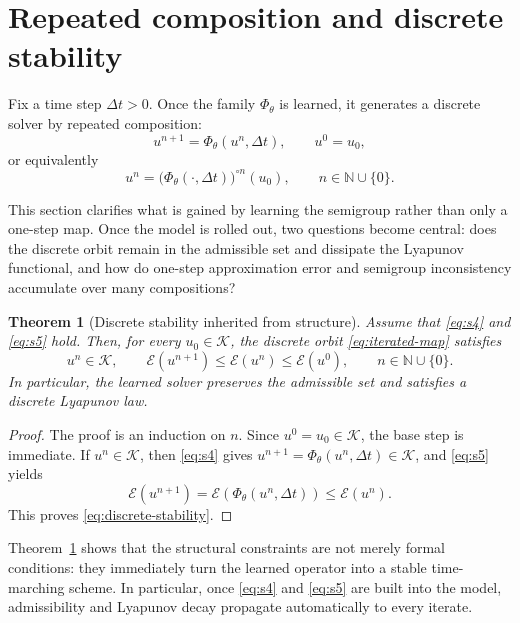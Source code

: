\documentclass[11pt]{article}
\newtheorem{theorem}{Theorem}
\newcommand{\N}{\mathbb{N}}
\newcommand{\cK}{\mathcal{K}}
\newcommand{\cE}{\mathcal{E}}
\newcommand{\PhiT}{\Phi_{\theta}}
\begin{document}
\section{Repeated composition and discrete stability}\label{sec:repeated-composition}
Fix a time step \(\Delta t>0\). Once the family \(\PhiT\) is learned, it generates a discrete solver by repeated composition:
\begin{equation}\label{eq:discrete-solver}
u^{n+1}=\PhiT(u^n,\Delta t), \qquad u^0=u_0,
\end{equation}
or equivalently
\begin{equation}\label{eq:iterated-map}
u^n=\bigl(\PhiT(\cdot,\Delta t)\bigr)^{\circ n}(u_0), \qquad n\in \N\cup\{0\}.
\end{equation}

This section clarifies what is gained by learning the semigroup rather than only a one-step map. Once the model is rolled out, two questions become central: does the discrete orbit remain in the admissible set and dissipate the Lyapunov functional, and how do one-step approximation error and semigroup inconsistency accumulate over many compositions?

\begin{theorem}[Discrete stability inherited from structure]\label{thm:stability}
Assume that \eqref{eq:s4} and \eqref{eq:s5} hold. Then, for every \(u_0\in \cK\), the discrete orbit \eqref{eq:iterated-map} satisfies
\begin{equation}\label{eq:discrete-stability}
u^n\in \cK, \qquad \cE(u^{n+1})\le \cE(u^n)\le \cE(u^0), \qquad n\in \N\cup\{0\}.
\end{equation}
In particular, the learned solver preserves the admissible set and satisfies a discrete Lyapunov law.
\end{theorem}

\begin{proof}
The proof is an induction on \(n\). Since \(u^0=u_0\in \cK\), the base step is immediate. If \(u^n\in \cK\), then \eqref{eq:s4} gives \(u^{n+1}=\PhiT(u^n,\Delta t)\in \cK\), and \eqref{eq:s5} yields
\begin{equation*}
\cE(u^{n+1})=\cE(\PhiT(u^n,\Delta t))\le \cE(u^n).
\end{equation*}
This proves \eqref{eq:discrete-stability}.
\end{proof}

Theorem~\ref{thm:stability} shows that the structural constraints are not merely formal conditions: they immediately turn the learned operator into a stable time-marching scheme. In particular, once \eqref{eq:s4} and \eqref{eq:s5} are built into the model, admissibility and Lyapunov decay propagate automatically to every iterate.
\end{document}
